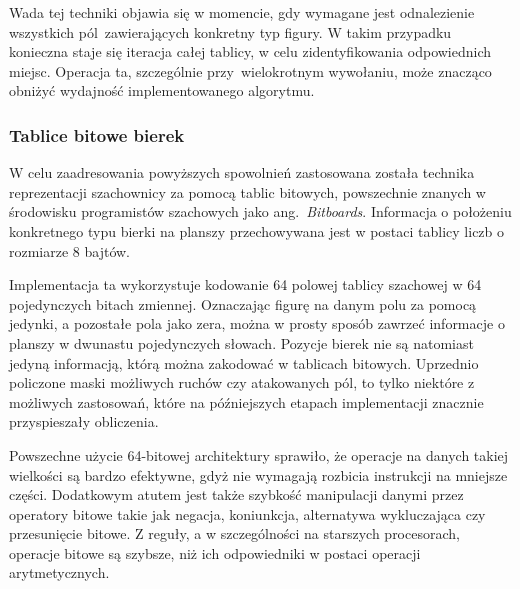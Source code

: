 Wada tej techniki objawia się w momencie, gdy wymagane jest odnalezienie wszystkich pól~zawierających konkretny typ figury.
W takim przypadku konieczna staje się iteracja całej tablicy, w celu zidentyfikowania odpowiednich miejsc.
Operacja ta, szczególnie przy~wielokrotnym wywołaniu, może znacząco obniżyć wydajność implementowanego algorytmu.

%
%
%
%


\subsubsection{Tablice bitowe bierek}

W celu zaadresowania powyższych spowolnień zastosowana została technika reprezentacji szachownicy za pomocą tablic bitowych, powszechnie znanych w środowisku programistów szachowych jako ang.~\emph{Bitboards}.
Informacja o położeniu konkretnego typu bierki na planszy przechowywana jest w postaci tablicy liczb o rozmiarze 8 bajtów.

Implementacja ta wykorzystuje kodowanie 64 polowej tablicy szachowej w 64 pojedynczych bitach zmiennej.
Oznaczając figurę na danym polu za pomocą jedynki, a pozostałe pola jako zera, można w prosty sposób zawrzeć informacje o planszy w dwunastu pojedynczych słowach.
Pozycje bierek nie są natomiast jedyną informacją, którą można zakodować w tablicach bitowych.
Uprzednio policzone maski możliwych ruchów czy atakowanych pól, to tylko niektóre z możliwych zastosowań, które na późniejszych etapach implementacji znacznie przyspieszały obliczenia.

Powszechne użycie 64-bitowej architektury sprawiło, że operacje na danych takiej wielkości są bardzo efektywne, gdyż nie wymagają rozbicia instrukcji na mniejsze części.
Dodatkowym atutem jest także szybkość manipulacji danymi przez operatory bitowe takie jak negacja, koniunkcja, alternatywa wykluczająca czy przesunięcie bitowe.
Z reguły, a w szczególności na starszych procesorach, operacje bitowe są szybsze, niż ich odpowiedniki w postaci operacji arytmetycznych.

%

